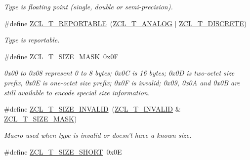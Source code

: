 \begin{DoxyCompactItemize}
\begin{DoxyCompactList}\small\item\em Type is floating point (single, double or semi-\/precision). \end{DoxyCompactList}\item 
\#define \hyperlink{group__zcl__types_gab0e5c23a0877c17fde12043c85728c29}{Z\-C\-L\-\_\-\-T\-\_\-\-R\-E\-P\-O\-R\-T\-A\-B\-L\-E}~(\hyperlink{group__zcl__types_ga7b609984d4662f83a2248d1f485fd4ad}{Z\-C\-L\-\_\-\-T\-\_\-\-A\-N\-A\-L\-O\-G} $|$ \hyperlink{group__zcl__types_ga3e9bf95af4f58a0c9c5c34639b0dda29}{Z\-C\-L\-\_\-\-T\-\_\-\-D\-I\-S\-C\-R\-E\-T\-E})
\begin{DoxyCompactList}\small\item\em Type is reportable. \end{DoxyCompactList}\item 
\#define \hyperlink{group__zcl__types_gaa49518f03f9632a55b3e1c4d4c68b60c}{Z\-C\-L\-\_\-\-T\-\_\-\-S\-I\-Z\-E\-\_\-\-M\-A\-S\-K}~0x0\-F
\begin{DoxyCompactList}\small\item\em 0x00 to 0x08 represent 0 to 8 bytes; 0x0\-C is 16 bytes; 0x0\-D is two-\/octet size prefix, 0x0\-E is one-\/octet size prefix; 0x0\-F is invalid; 0x09, 0x0\-A and 0x0\-B are still available to encode special size information. \end{DoxyCompactList}\item 
\hypertarget{group__zcl__types_ga5f381526f4ac9adac8cb07b7135e737d}{\#define \hyperlink{group__zcl__types_ga5f381526f4ac9adac8cb07b7135e737d}{Z\-C\-L\-\_\-\-T\-\_\-\-S\-I\-Z\-E\-\_\-\-I\-N\-V\-A\-L\-I\-D}~(\hyperlink{group__zcl__types_ga7609ed68cf4399cb2c09799ecedfdbe0}{Z\-C\-L\-\_\-\-T\-\_\-\-I\-N\-V\-A\-L\-I\-D} \& \hyperlink{group__zcl__types_gaa49518f03f9632a55b3e1c4d4c68b60c}{Z\-C\-L\-\_\-\-T\-\_\-\-S\-I\-Z\-E\-\_\-\-M\-A\-S\-K})}\label{group__zcl__types_ga5f381526f4ac9adac8cb07b7135e737d}

\begin{DoxyCompactList}\small\item\em Macro used when type is invalid or doesn't have a known size. \end{DoxyCompactList}\item 
\hypertarget{group__zcl__types_ga5121bb1f631a19b8a50980325ee67c26}{\#define \hyperlink{group__zcl__types_ga5121bb1f631a19b8a50980325ee67c26}{Z\-C\-L\-\_\-\-T\-\_\-\-S\-I\-Z\-E\-\_\-\-S\-H\-O\-R\-T}~0x0\-E}\label{group__zcl__types_ga5121bb1f631a19b8a50980325ee67c26}


\end{DoxyCompactItemize}
